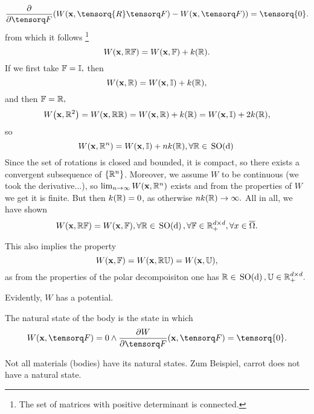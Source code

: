 \documentclass[11pt]{scrartcl} %
\begin{document}
\[
	\pdv{\fgrad}\qty(W\qty(\vb{x},\tensorq{R}\fgrad)-W\qty(\vb{x},\fgrad)) = \tensorq{0}.
\]
from which it follows \footnote{The set of matrices with positive determinant is connected.}
\[
	W\qty(\vb{x},\mathbb{R} \mathbb{F}) = W\qty(\vb{x},\mathbb{F}) + k\qty(\mathbb{R}).
\]
If we first take $\mathbb{F} = \mathbb{I},$ then
\[
	W\qty(\vb{x}, \mathbb{R}) = W\qty(\vb{x}, \mathbb{I}) + k\qty(\mathbb{R}),
\]
and then $\mathbb{F} = \mathbb{R},$
\[
	W\qty(\vb{x}, \mathbb{R}^{2}) = W\qty(\vb{x},\mathbb{R}\mathbb{R}) = W\qty(\vb{x},\mathbb{R})+k\qty(\mathbb{R}) = W\qty(\vb{x},\mathbb{I})+2 k\qty(\mathbb{R}),
\]
 so
\[
	W\qty(\vb{x},\mathbb{R}^n)=W\qty(\vb{x},\mathbb{I})+nk\qty(\mathbb{R}), \forall \mathbb{R} \in \, \text{SO(d)} \,
\]
Since the set of rotations is closed and bounded, it is compact, so there exists a convergent subsequence of $\{\mathbb{R}^n\}$. Moreover, we assume $W$ to be continuous (we took the derivative...), so $\lim_{n \to \infty}W\qty(\vb{x},\mathbb{R}^n)$ exists and from the properties of $W$ we get it is finite. But then $k\qty(\mathbb{R}) = 0$, as otherwise $nk\qty(\mathbb{R})\to \infty.$ All in all, we have shown
\begin{equation}
    W\qty(\vb{x}, \mathbb{R}\mathbb{F}) = W\qty(\vb{x},\mathbb{F}), \forall \mathbb{R} \in \, \text{SO(d)} \,, \forall \mathbb{F} \in {\mathbb R}^{d \times d}_+, \forall x \in \overline{\Omega}.
\end{equation}

This also implies the property
\[
	W\qty(\vb{x}, \mathbb{F}) = W\qty(\vb{x}, \mathbb{R} \mathbb{U}) = W\qty(\vb{x}, \mathbb{U}),
\]
as from the properties of the polar decompoisiton one has $\mathbb{R} \in \, \text{SO(d)} \,, \mathbb{U} \in {\mathbb R}^{d \times d}_+.$
	
\begin{remark}
    Evidently, $W$ has a potential.
\end{remark}

\begin{definition}
    The natural state of the body is the state in which
    \begin{equation}
	    \label{eq:natural}
	    W(\vb{x},\fgrad) = 0 \wedge \pdv{W}{\fgrad}\qty(\vb{x},\fgrad) = \tensorq{0}.
    \end{equation}
\end{definition}

\begin{remark}
    Not all materials (bodies) have its natural states. Zum Beispiel, carrot does not have a natural state.
\end{remark}
\end{document}
